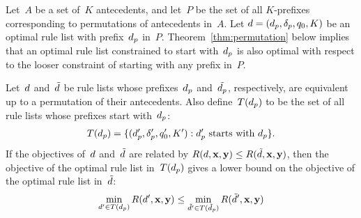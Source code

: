 Let~$A$ be a set of~$K$ antecedents, and let~$P$ be the set of all
$K$-prefixes corresponding to permutations of antecedents in~$A$.
%
Let ${{d} = (d_p, \delta_p, q_0, K)}$ be an optimal rule list
with prefix~$d_p$ in~$P$.
%
Theorem~\ref{thm:permutation} below implies that
an optimal rule list constrained to start with~$d_p$
is also optimal with respect to the looser constraint of
starting with any prefix in~$P$.

\begin{theorem}
\label{thm:permutation}
Let~${d}$ and~$\tilde {{d}}$ be rule lists
whose prefixes~$d_p$ and~$\tilde{d_p}$, respectively,
are equivalent up to a permutation of their antecedents.
%
Also define~$T(d_p)$ to be the set of all rule lists whose
prefixes start with~$d_p$:
\begin{align}
T(\Prefix) =
\{(\Prefix', \Labels', q'_0, K') : \Prefix' \textnormal{ starts with } \Prefix \}.
\end{align}
If the objectives of~${d}$ and~$\tilde {{d}}$ are related by
${R({d}, \mathbf{x}, \mathbf{y}) \le R(\tilde {{d}}, \mathbf{x}, \mathbf{y})}$,
then the objective of the optimal rule list in~$T(d_p)$ gives a
lower bound on the objective of the optimal rule list in~$\tilde {{d}}$:
\begin{align}
\min_{\RL' \in T(\Prefix)} \Obj(\RL', \x, \y)
\le \min_{\tilde \RL' \in T(\tPrefix)} \Obj(\tilde \RL', \x, \y)
\label{eq:permutation}
\end{align}
\end{theorem}

